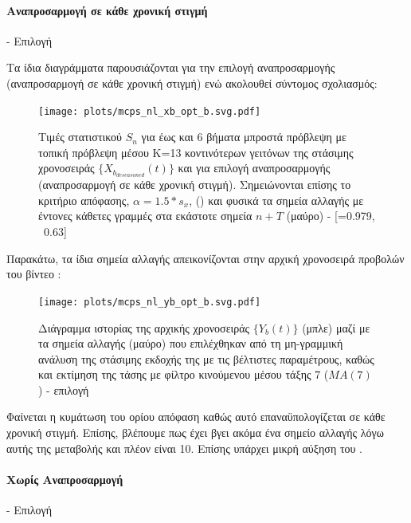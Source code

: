 \paragraph{Αναπροσαρμογή σε κάθε χρονική στιγμή}- Επιλογή 

Τα ίδια διαγράμματα παρουσιάζονται για την επιλογή αναπροσαρμογής  (αναπροσαρμογή σε κάθε χρονική στιγμή) ενώ ακολουθεί σύντομος σχολιασμός:

\begin{figure}[H]
    \begin{center}
        \texttt{[image: plots/mcps\_nl\_xb\_opt\_b.svg.pdf]}
        \caption{Τιμές στατιστικού $S_n$ για έως και 6 βήματα μπροστά πρόβλεψη με τοπική πρόβλεψη μέσου Κ=13 κοντινότερων γειτόνων της στάσιμης χρονοσειράς $\{X_{b_{deseasoned}}(t)\}$ και για επιλογή αναπροσαρμογής  (αναπροσαρμογή σε κάθε χρονική στιγμή). Σημειώνονται επίσης το κριτήριο απόφασης, $\alpha=1.5*s_x$, () και φυσικά τα σημεία αλλαγής με έντονες κάθετες γραμμές στα εκάστοτε σημεία $n+T$ (μαύρο) - [=0.979, \ 0.63]}
        \label{fig:mcps_nl_xb_opt_b}
    \end{center}
\end{figure}

Παρακάτω, τα ίδια σημεία αλλαγής απεικονίζονται στην αρχική χρονοσειρά προβολών του βίντεο :

\begin{figure}[H]
    \begin{center}
        \texttt{[image: plots/mcps\_nl\_yb\_opt\_b.svg.pdf]}
        \caption{Διάγραμμα ιστορίας της αρχικής χρονοσειράς $\{Y_b(t)\}$ (μπλε) μαζί με τα σημεία αλλαγής (μαύρο) που επιλέχθηκαν από τη μη-γραμμική ανάλυση της στάσιμης εκδοχής της με τις βέλτιστες παραμέτρους, καθώς και εκτίμηση της τάσης με φίλτρο κινούμενου μέσου τάξης 7 ($MA(7)$ ) - επιλογή }
        \label{fig:mcps_nl_yb_opt_b}
    \end{center}
\end{figure}

Φαίνεται η κυμάτωση του ορίου απόφαση καθώς αυτό επαναϋπολογίζεται σε κάθε χρονική στιγμή. Επίσης, βλέπουμε πως έχει βγει ακόμα ένα σημείο αλλαγής λόγω αυτής της μεταβολής και πλέον είναι 10. Επίσης υπάρχει μικρή αύξηση του .

\paragraph{Χωρίς Αναπροσαρμογή}- Επιλογή 

